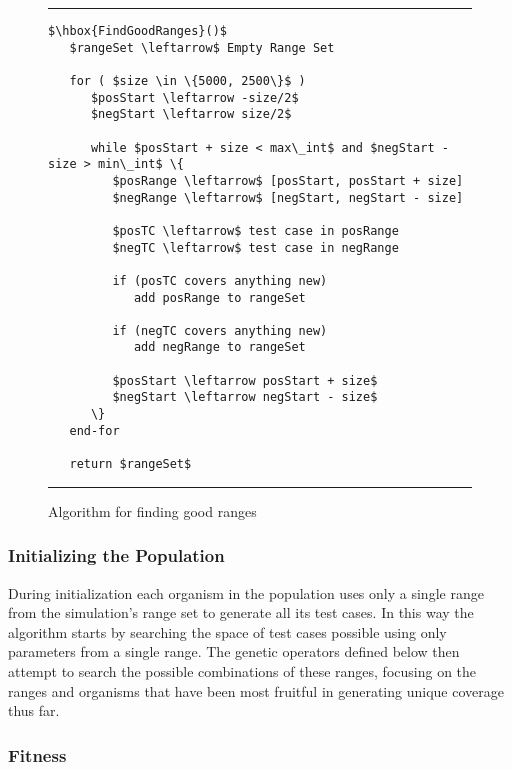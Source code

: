 \documentclass[runningheads]{llncs}
\begin{document}
\begin{figure}[h!]
\begin{center}
\hrule
\medskip
\begin{Verbatim}[fontfamily=tt, xleftmargin=10pt, commandchars=\\\{\},
codes={\catcode`$=3\catcode`^=7\catcode`_=8}]
$\hbox{FindGoodRanges}()$  
   $rangeSet \leftarrow$ Empty Range Set
		
   for ( $size \in \{5000, 2500\}$ ) 
      $posStart \leftarrow -size/2$
      $negStart \leftarrow size/2$
		
      while $posStart + size < max\_int$ and $negStart - size > min\_int$ \{
         $posRange \leftarrow$ [posStart, posStart + size]
         $negRange \leftarrow$ [negStart, negStart - size]
		
         $posTC \leftarrow$ test case in posRange
         $negTC \leftarrow$ test case in negRange
		
         if (posTC covers anything new)
            add posRange to rangeSet
		
         if (negTC covers anything new)
            add negRange to rangeSet
		
         $posStart \leftarrow posStart + size$
         $negStart \leftarrow negStart - size$
      \}
   end-for
		
   return $rangeSet$
\end{Verbatim}
\hrule
\end{center}
\caption{Algorithm for finding good ranges \label{fig:ranges}}
\end{figure}
\FloatBarrier

\subsubsection{Initializing the Population}

During initialization each organism in the population uses only a single range from the simulation's range set to generate all its test cases. In this way the algorithm starts by searching the space of test cases possible using only parameters from a single range. The genetic operators defined below then attempt to search the possible combinations of these ranges, focusing on the ranges and organisms that have been most fruitful in generating unique coverage thus far.

\subsubsection{Fitness}
\end{document}
